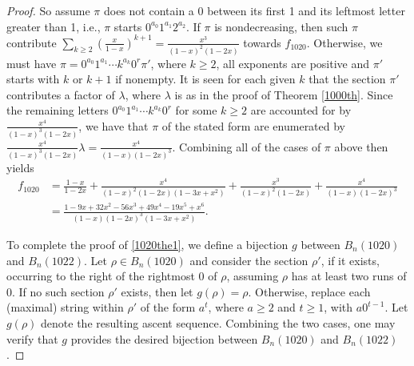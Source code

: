 \documentclass{article}
\theoremstyle{remark}
\theoremstyle{plain}
\begin{document}
\begin{proof}
So assume $\pi$ does not contain a 0 between its first 1 and its leftmost letter greater than 1, i.e., $\pi$ starts $0^{a_0}1^{a_1}2^{a_2}$.  If $\pi$ is nondecreasing, then such $\pi$ contribute $\sum_{k\geq2}\left(\frac{x}{1-x}\right)^{k+1}=\frac{x^3}{(1-x)^2(1-2x)}$ towards $f_{1020}$.  Otherwise, we must have $\pi=0^{a_0}1^{a_1}\cdots k^{a_k}0^r\pi'$, where $k \geq 2$, all exponents are positive and $\pi'$ starts with $k$ or $k+1$ if nonempty.  It is seen for each given $k$ that the section $\pi'$ contributes a factor of $\lambda$, where $\lambda$ is as in the proof of Theorem \ref{1000th}.  Since the remaining letters $0^{a_0}1^{a_1}\cdots k^{a_k}0^r$ for some $k \geq 2$ are accounted for by $\frac{x^4}{(1-x)^3(1-2x)}$, we have that $\pi$ of the stated form are enumerated by $\frac{x^4}{(1-x)^3(1-2x)}\lambda=\frac{x^4}{(1-x)(1-2x)^3}$.
Combining all of the cases of $\pi$ above then yields
\begin{align*}
f_{1020}&=\frac{1-x}{1-2x}+\frac{x^4}{(1-x)^2(1-2x)(1-3x+x^2)}+\frac{x^3}{(1-x)^2(1-2x)}+\frac{x^4}{(1-x)(1-2x)^3}\\
&=\frac{1-9x+32x^2-56x^3+49x^4-19x^5+x^6}{(1-x)(1-2x)^3(1-3x+x^2)}.
\end{align*}

To complete the proof of \eqref{1020the1}, we define a bijection $g$ between $B_n(1020)$ and $B_n(1022)$.  Let $\rho \in B_n(1020)$ and consider the section $\rho'$, if it exists, occurring to the right of the rightmost 0 of $\rho$, assuming $\rho$ has at least two runs of $0$.  If no such section $\rho'$ exists, then let $g(\rho)=\rho$.  Otherwise, replace each (maximal) string within $\rho'$ of the form $a^t$, where $a \geq 2$ and $t \geq 1$, with $a0^{t-1}$. Let $g(\rho)$ denote the resulting ascent sequence.  Combining the two cases, one may verify that $g$ provides the desired bijection between $B_n(1020)$ and $B_n(1022)$.
\end{proof}
\end{document}
